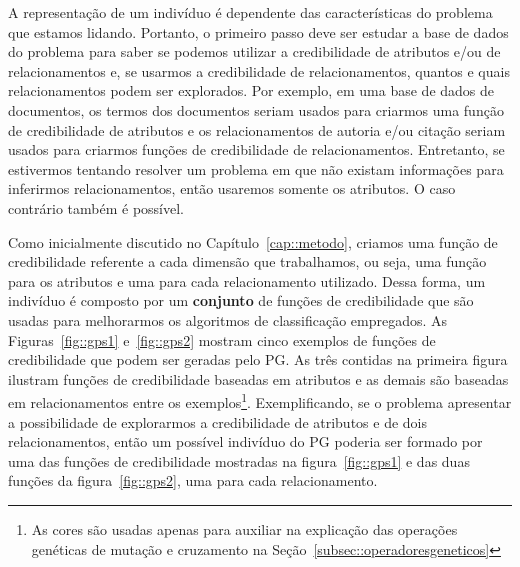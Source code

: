 A representação de um indivíduo é dependente das características do problema que estamos lidando. 
Portanto, o primeiro passo deve ser estudar a base de dados do problema para saber se podemos utilizar a credibilidade de atributos e/ou de relacionamentos e, se usarmos a credibilidade de relacionamentos, quantos e quais relacionamentos podem ser explorados.
Por exemplo, em uma base de dados de documentos, os termos dos documentos seriam usados para criarmos uma função de credibilidade de atributos e os relacionamentos de autoria e/ou citação seriam usados para criarmos funções de credibilidade de relacionamentos. Entretanto, se estivermos tentando resolver um problema em que não existam informações para inferirmos relacionamentos, então usaremos somente os atributos. O caso contrário também é possível.

Como inicialmente discutido no Capítulo~\ref{cap::metodo}, criamos uma função de credibilidade referente a cada dimensão que trabalhamos, ou seja, uma função para os atributos e uma para cada relacionamento utilizado. Dessa forma, um indivíduo é composto por um \textbf{conjunto} de funções de credibilidade que são usadas para melhorarmos os algoritmos de classificação empregados.
As Figuras~\ref{fig::gps1} e~\ref{fig::gps2} mostram cinco exemplos de funções de credibilidade que podem ser geradas pelo \textsc{PG}. As três contidas na primeira figura ilustram funções de credibilidade baseadas em atributos e as demais são baseadas em relacionamentos entre os exemplos\footnote{As cores são usadas apenas para auxiliar na explicação das operações genéticas de mutação e cruzamento na Seção~\ref{subsec::operadoresgeneticos}}.
Exemplificando, se o problema apresentar a possibilidade de explorarmos a credibilidade de atributos e de dois relacionamentos, então um possível indivíduo do \textsc{PG} poderia ser formado por uma das funções de credibilidade mostradas na figura~\ref{fig::gps1} e das duas funções da figura~\ref{fig::gps2}, uma para cada relacionamento.



